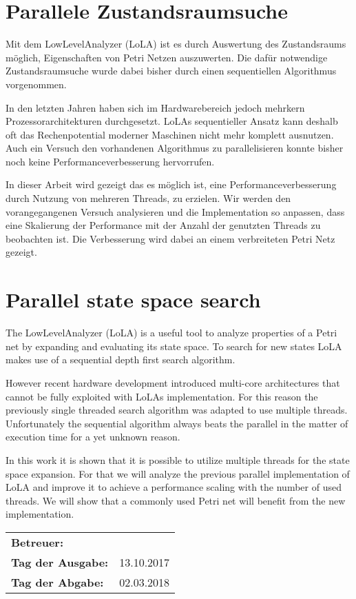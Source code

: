 \section*{Parallele Zustandsraumsuche}
Mit dem LowLevelAnalyzer (LoLA) ist es durch Auswertung des Zustandsraums möglich, Eigenschaften von Petri Netzen auszuwerten. Die dafür notwendige Zustandsraumsuche wurde dabei bisher durch einen sequentiellen Algorithmus vorgenommen.

In den letzten Jahren haben sich im Hardwarebereich jedoch mehrkern Prozessorarchitekturen durchgesetzt. LoLAs sequentieller Ansatz kann deshalb oft das Rechenpotential moderner Maschinen nicht mehr komplett ausnutzen. Auch ein Versuch den vorhandenen Algorithmus zu parallelisieren konnte bisher noch keine Performanceverbesserung hervorrufen.

In dieser Arbeit wird gezeigt das es möglich ist, eine Performanceverbesserung durch Nutzung von mehreren Threads, zu erzielen. Wir werden den vorangegangenen Versuch analysieren und die Implementation so anpassen, dass eine Skalierung der Performance mit der Anzahl der genutzten Threads zu beobachten ist. Die Verbesserung wird dabei an einem verbreiteten Petri Netz gezeigt.

\section*{Parallel state space search}
The LowLevelAnalyzer (LoLA) is a useful tool to analyze properties of a Petri net by expanding and evaluating its state space. To search for new states LoLA makes use of a sequential depth first search algorithm.

However recent hardware development introduced multi-core architectures that cannot be fully exploited with LoLAs implementation. For this reason the previously single threaded search algorithm was adapted to use multiple threads. Unfortunately the sequential algorithm always beats the parallel in the matter of execution time for a yet unknown reason.

In this work it is shown that it is possible to utilize multiple threads for the state space expansion. For that we will analyze the previous parallel implementation of LoLA and improve it to achieve a performance scaling with the number of used threads. We will show that a commonly used Petri net will benefit from the new implementation.



\vfill

\begin{tabular}{ll}
	\bfseries Betreuer: & \parbox[t]{10cm}{\betreuer }\vspace{5mm} \\
	\bfseries Tag der Ausgabe: & 13.10.2017 \\
	\bfseries Tag der Abgabe: & 02.03.2018 \\
\end{tabular}